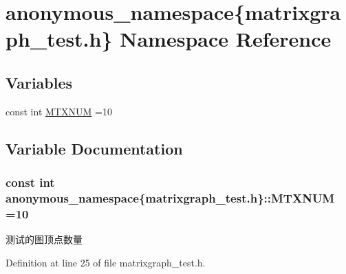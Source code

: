 \hypertarget{namespaceanonymous__namespace_02matrixgraph__test_8h_03}{}\section{anonymous\+\_\+namespace\{matrixgraph\+\_\+test.\+h\} Namespace Reference}
\label{namespaceanonymous__namespace_02matrixgraph__test_8h_03}
\subsection*{Variables}
\begin{DoxyCompactItemize}
\item 
const int \hyperlink{namespaceanonymous__namespace_02matrixgraph__test_8h_03_a07b3c20a610653281d3f91b60f576e05}{M\+T\+X\+N\+U\+M} =10
\end{DoxyCompactItemize}


\subsection{Variable Documentation}
\hypertarget{namespaceanonymous__namespace_02matrixgraph__test_8h_03_a07b3c20a610653281d3f91b60f576e05}{}
\subsubsection[{M\+T\+X\+N\+U\+M}]{\setlength{\rightskip}{0pt plus 5cm}const int anonymous\+\_\+namespace\{matrixgraph\+\_\+test.\+h\}\+::M\+T\+X\+N\+U\+M =10}\label{namespaceanonymous__namespace_02matrixgraph__test_8h_03_a07b3c20a610653281d3f91b60f576e05}
测试的图顶点数量 

Definition at line 25 of file matrixgraph\+\_\+test.\+h.

